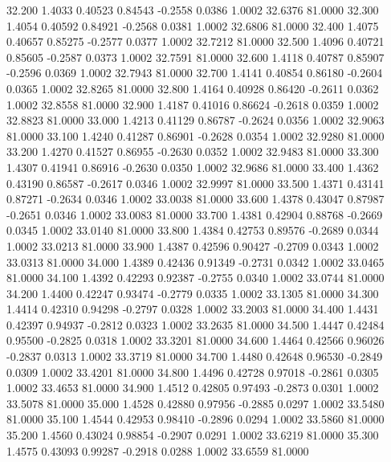   32.200   1.4033   0.40523   0.84543  -0.2558   0.0386   1.0002  32.6376  81.0000
  32.300   1.4054   0.40592   0.84921  -0.2568   0.0381   1.0002  32.6806  81.0000
  32.400   1.4075   0.40657   0.85275  -0.2577   0.0377   1.0002  32.7212  81.0000
  32.500   1.4096   0.40721   0.85605  -0.2587   0.0373   1.0002  32.7591  81.0000
  32.600   1.4118   0.40787   0.85907  -0.2596   0.0369   1.0002  32.7943  81.0000
  32.700   1.4141   0.40854   0.86180  -0.2604   0.0365   1.0002  32.8265  81.0000
  32.800   1.4164   0.40928   0.86420  -0.2611   0.0362   1.0002  32.8558  81.0000
  32.900   1.4187   0.41016   0.86624  -0.2618   0.0359   1.0002  32.8823  81.0000
  33.000   1.4213   0.41129   0.86787  -0.2624   0.0356   1.0002  32.9063  81.0000
  33.100   1.4240   0.41287   0.86901  -0.2628   0.0354   1.0002  32.9280  81.0000
  33.200   1.4270   0.41527   0.86955  -0.2630   0.0352   1.0002  32.9483  81.0000
  33.300   1.4307   0.41941   0.86916  -0.2630   0.0350   1.0002  32.9686  81.0000
  33.400   1.4362   0.43190   0.86587  -0.2617   0.0346   1.0002  32.9997  81.0000
  33.500   1.4371   0.43141   0.87271  -0.2634   0.0346   1.0002  33.0038  81.0000
  33.600   1.4378   0.43047   0.87987  -0.2651   0.0346   1.0002  33.0083  81.0000
  33.700   1.4381   0.42904   0.88768  -0.2669   0.0345   1.0002  33.0140  81.0000
  33.800   1.4384   0.42753   0.89576  -0.2689   0.0344   1.0002  33.0213  81.0000
  33.900   1.4387   0.42596   0.90427  -0.2709   0.0343   1.0002  33.0313  81.0000
  34.000   1.4389   0.42436   0.91349  -0.2731   0.0342   1.0002  33.0465  81.0000
  34.100   1.4392   0.42293   0.92387  -0.2755   0.0340   1.0002  33.0744  81.0000
  34.200   1.4400   0.42247   0.93474  -0.2779   0.0335   1.0002  33.1305  81.0000
  34.300   1.4414   0.42310   0.94298  -0.2797   0.0328   1.0002  33.2003  81.0000
  34.400   1.4431   0.42397   0.94937  -0.2812   0.0323   1.0002  33.2635  81.0000
  34.500   1.4447   0.42484   0.95500  -0.2825   0.0318   1.0002  33.3201  81.0000
  34.600   1.4464   0.42566   0.96026  -0.2837   0.0313   1.0002  33.3719  81.0000
  34.700   1.4480   0.42648   0.96530  -0.2849   0.0309   1.0002  33.4201  81.0000
  34.800   1.4496   0.42728   0.97018  -0.2861   0.0305   1.0002  33.4653  81.0000
  34.900   1.4512   0.42805   0.97493  -0.2873   0.0301   1.0002  33.5078  81.0000
  35.000   1.4528   0.42880   0.97956  -0.2885   0.0297   1.0002  33.5480  81.0000
  35.100   1.4544   0.42953   0.98410  -0.2896   0.0294   1.0002  33.5860  81.0000
  35.200   1.4560   0.43024   0.98854  -0.2907   0.0291   1.0002  33.6219  81.0000
  35.300   1.4575   0.43093   0.99287  -0.2918   0.0288   1.0002  33.6559  81.0000
